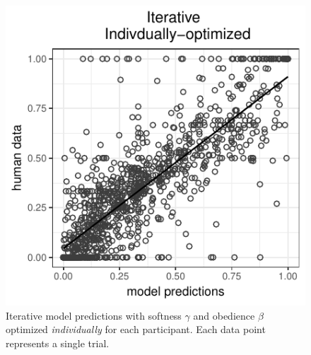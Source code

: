 \documentclass[10pt,a4paper]{article}
\begin{document}
\begin{figure}[t]
	\centering
	\includegraphics[width=.8\linewidth]{images/m2.pdf}
	\caption{Iterative model predictions with softness $\gamma$ and obedience $\beta$ optimized \emph{individually} for each participant. Each data point represents a single trial.}
		\label{iterative_individually}
\end{figure}
\end{document}

